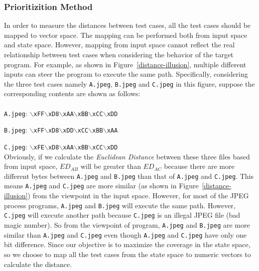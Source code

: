 \subsubsection{Prioritizition Method}
In order to measure the distances between test cases, all the test cases should be mapped to vector space. 
The mapping can be performed both from input space and state space. However, mapping from input space cannot reflect the real relationship between test cases when considering the behavior of the target program. For example, as shown in Figure~\ref{distance-illusion}, multiple different inputs can steer the program to execute the same path. Specifically, considering the three test cases namely \texttt{A.jpeg}, \texttt{B.jpeg} and \texttt{C.jpeg} in this figure, suppose the corresponding contents are shown as follows:
\\
\\
\indent\texttt{A.jpeg}: \texttt{$\backslash$xFF$\backslash$xD8$\backslash$xAA$\backslash$xBB$\backslash$xCC$\backslash$xDD}

\texttt{B.jpeg}: \texttt{$\backslash$xFF$\backslash$xD8$\backslash$xDD$\backslash$xCC$\backslash$xBB$\backslash$xAA}

\texttt{C.jpeg}: \texttt{$\backslash$xFE$\backslash$xD8$\backslash$xAA$\backslash$xBB$\backslash$xCC$\backslash$xDD}
\\

\indent Obviously, if we calculate the \textit{Euclidean Distance} between these three files based from input space, $ED_{AB}$ will be greater than $ED_{AC}$ because there are more different bytes between \texttt{A.jpeg} and \texttt{B.jpeg} than that of \texttt{A.jpeg} and \texttt{C.jpeg}. This means \texttt{A.jpeg} and \texttt{C.jpeg} are more similar (as shown in Figure~\ref{distance-illusion}) from the viewpoint in the input space. 
However, for most of the JPEG process programs, \texttt{A.jpeg} and \texttt{B.jpeg} will execute the same path. However, \texttt{C.jpeg} will execute another path because \texttt{C.jpeg} is an illegal JPEG file (bad magic number). So from the viewpoint of program, \texttt{A.jpeg} and \texttt{B.jpeg} are more similar than \texttt{A.jpeg} and \texttt{C.jpeg} even though \texttt{A.jpeg} and \texttt{C.jpeg} have only one bit difference. 
Since our objective is to maximize the coverage in the state space, so we choose to map all the test cases from the state space to numeric vectors to calculate the distance.

